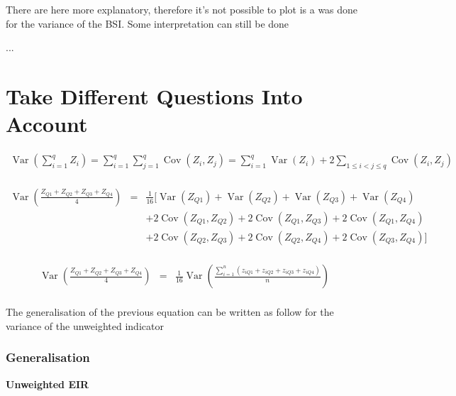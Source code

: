 \documentclass[12pt,a4paper,oneside]{book}
\DeclareMathOperator{\Var}{Var}
\DeclareMathOperator{\Cov}{Cov}
\begin{document}
 
There are here more explanatory, therefore it's not possible to plot is a was done for the variance of the BSI. Some interpretation can still be done

...

\section{Take Different Questions Into Account}



\begin{eqnarray}
\Var \left(\sum_{i=1}^{q} Z_{i}\right) = \sum_{i=1}^{q} \sum_{j=1}^{q} \Cov\left(Z_{i}, Z_{j}\right)
= \sum_{i=1}^{q} \Var\left(Z_{i}\right)+2 \sum_{1 \leq i<j \leq q} \Cov\left(Z_{i}, Z_{j}\right) \\ \nonumber
\end{eqnarray} 



\begin{eqnarray}
    \Var \left(\frac{Z_{Q1} + Z_{Q2} + Z_{Q3} + Z_{Q4}}{4} \right) 
    &=& \frac{1}{16} \Big[ \Var(Z_{Q1}) + \Var(Z_{Q2}) + \Var(Z_{Q3}) + \Var(Z_{Q4}) \nonumber \\
    && + 2 \Cov (Z_{Q1},Z_{Q2}) + 2 \Cov (Z_{Q1},Z_{Q3}) + 2 \Cov (Z_{Q1},Z_{Q4}) \nonumber \\
    &&  + 2 \Cov (Z_{Q2},Z_{Q3}) + 2 \Cov (Z_{Q2},Z_{Q4}) + 2 \Cov (Z_{Q3},Z_{Q4}) \Big] \nonumber \\
\end{eqnarray}



\begin{eqnarray}
    \Var \left(\frac{Z_{Q1} + Z_{Q2} + Z_{Q3} + Z_{Q4}}{4} \right) 
    &=& \frac{1}{16} \Var \left(\frac{\sum_{i=1}^n \left(z_{i Q1} + z_{i Q2} + z_{i Q3} + z_{i Q4} \right)}{n} \right) \nonumber \\
\end{eqnarray}

The generalisation of the previous equation can be written as follow for the variance of the unweighted indicator


\newpage
\subsubsection{Generalisation}

\textbf{Unweighted EIR}
\end{document}
